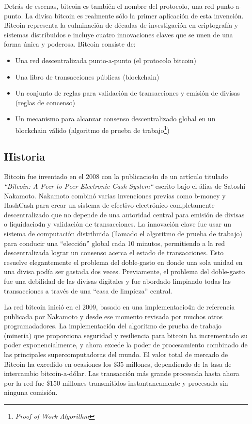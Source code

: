 \documentclass[10pt,journal,compsoc]{IEEEtran}
\begin{document}
Detrás de escenas, bitcoin es también el nombre del protocolo, una red punto-a-punto. La divisa bitcoin es realmente sólo la primer aplicación de esta invención. Bitcoin representa la culminación de décadas de investigación en criptografía y sistemas distribuidos e incluye cuatro innovaciones claves que se unen de una forma única y poderosa. Bitcoin consiste de:
\begin{itemize}
    \item Una red descentralizada punto-a-punto (el protocolo bitcoin)
    \item Una libro de transacciones públicas (blockchain)
    \item Un conjunto de reglas para validación de transacciones y emisión de divisas (reglas de concenso)
    \item Un mecanismo para alcanzar consenso descentralizado global en un blockchain válido (algoritmo de prueba de trabajo\footnote{\emph{Proof-of-Work Algorithm}})
\end{itemize}

\subsection{Historia}
Bitcoin fue inventado en el 2008 con la publicacio4n de un artículo titulado \emph{``Bitcoin: A Peer-to-Peer Electronic Cash System``} escrito bajo el álias de Satoshi Nakamoto. Nakamoto combinó varias invenciones previas como b-money y HashCash para crear un sistema de efectivo electrónico completamente descentralizado que no depende de una autoridad central para emisión de divisas o liquidacio4n y validación de transacciones. La innovación clave fue usar un sistema de computación distribuida (llamado el algoritmo de prueba de trabajo) para conducir una ``elección'' global cada 10 minutos, permitiendo a la red descentralizada lograr un consenso acerca el estado de transacciones. Esto resuelve elegantemente el problema del doble-gasto en donde una sola unidad en una divisa podía ser gastada dos veces. Previamente, el problema del doble-gasto fue una debilidad de las divisas digitales y fue abordado limpiando todas las transacciones a través de una ``casa de limpieza'' central.

La red bitcoin inició en el 2009, basado en una implementacio4n de referencia publicada por Nakamoto y desde ese momento revisada por muchos otros programadadores. La implementación del algoritmo de prueba de trabajo (minería) que proporciona seguridad y resiliencia para bitcoin ha incrementado su poder exponencialmente, y ahora excede la poder de procesamiento combinado de las principales supercomputadoras del mundo. El valor total de mercado de Bitcoin ha excedido en ocasiones los \$35 millones, dependiendo de la tasa de intercambio bitcoin-a-dólar. Las transacción más grande procesada hasta ahora por la red fue \$150 millones transmitidos instantaneamente y procesada sin ninguna comisión.
\end{document}
